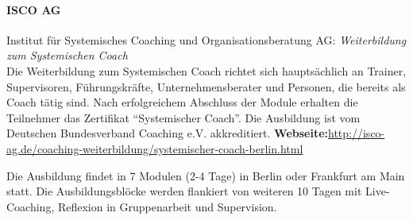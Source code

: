\documentclass[11pt,a4paper]{article}
\begin{document}
\paragraph{\textsf{ISCO AG}} Institut für Systemisches Coaching und Organisationsberatung AG: \textsl{Weiterbildung zum Systemischen Coach}\\
Die Weiterbildung zum Systemischen Coach richtet sich hauptsächlich an Trainer, Supervisoren, Führungskräfte, Unternehmensberater und Personen, die bereits als Coach tätig sind. Nach erfolgreichem Abschluss der Module erhalten die Teilnehmer das Zertifikat "`Systemischer Coach"'. Die Ausbildung ist vom Deutschen Bundesverband Coaching e.V. akkreditiert.
\textbf{Webseite:}\textsf{\textcolor{MidnightBlue}{\url{http://isco-ag.de/coaching-weiterbildung/systemischer-coach-berlin.html}}}

Die Ausbildung findet in 7 Modulen (2-4 Tage) in Berlin oder Frankfurt am Main statt. Die Ausbildungsblöcke werden flankiert von weiteren 10 Tagen mit Live-Coaching, Reflexion in Gruppenarbeit und Supervision.
\end{document}
